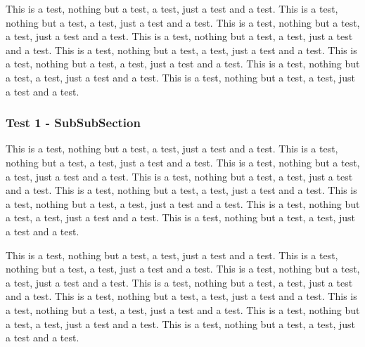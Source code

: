 This is a test, nothing but a test, a test, just a test and a test.
This is a test, nothing but a test, a test, just a test and a test.
This is a test, nothing but a test, a test, just a test and a test.
This is a test, nothing but a test, a test, just a test and a test.
This is a test, nothing but a test, a test, just a test and a test.
This is a test, nothing but a test, a test, just a test and a test.
This is a test, nothing but a test, a test, just a test and a test.
This is a test, nothing but a test, a test, just a test and a test.

\subsubsection{Test 1 - SubSubSection}

This is a test, nothing but a test, a test, just a test and a test.
This is a test, nothing but a test, a test, just a test and a test.
This is a test, nothing but a test, a test, just a test and a test.
This is a test, nothing but a test, a test, just a test and a test.
This is a test, nothing but a test, a test, just a test and a test.
This is a test, nothing but a test, a test, just a test and a test.
This is a test, nothing but a test, a test, just a test and a test.
This is a test, nothing but a test, a test, just a test and a test.

This is a test, nothing but a test, a test, just a test and a test.
This is a test, nothing but a test, a test, just a test and a test.
This is a test, nothing but a test, a test, just a test and a test.
This is a test, nothing but a test, a test, just a test and a test.
This is a test, nothing but a test, a test, just a test and a test.
This is a test, nothing but a test, a test, just a test and a test.
This is a test, nothing but a test, a test, just a test and a test.
This is a test, nothing but a test, a test, just a test and a test.
